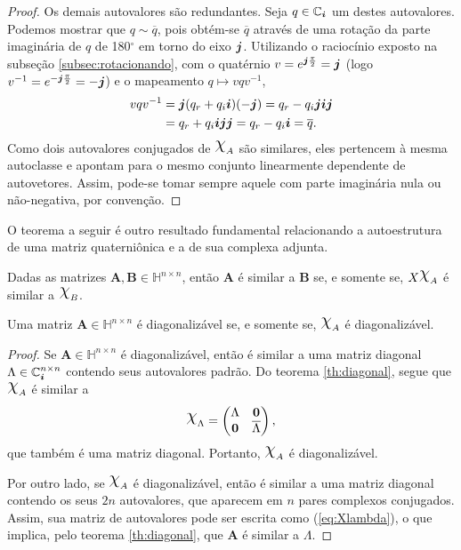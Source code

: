 \begin{proof}
Os demais autovalores s\~ao redundantes. Seja $ q \in \mathbb{C}_{\boldsymbol{i}}$ um destes autovalores. Podemos mostrar que $ q \sim \overline{q} $, pois obt\'em-se $ \overline{q} $ atrav\'es de uma rota\c c\~ao da parte imagin\'aria de $ q $ de 180$ ^\circ $ em torno do eixo $ \boldsymbol{j} $. Utilizando o racioc\'inio exposto na subse\c c\~ao \ref{subsec:rotacionando}, com o quat\'ernio $ v = e^{\boldsymbol{j} \frac{\pi}{2}} = \boldsymbol{j} $ (logo $ v^{-1} = e^{- \boldsymbol{j} \frac{\pi}{2}} = -\boldsymbol{j} $) e o mapeamento $ q \mapsto v q v^{-1} $,
\begin{equation}
\begin{aligned}
v q v^{-1} &= \boldsymbol{j} (q_r + q_i \boldsymbol{i}) (-\boldsymbol{j}) = q_r - q_i \boldsymbol{j} \boldsymbol{i} \boldsymbol{j}\\
&= q_r + q_i \boldsymbol{i} \boldsymbol{j} \boldsymbol{j} = q_r - q_i \boldsymbol{i} = \overline{q}.
\end{aligned}
\end{equation}
Como dois autovalores conjugados de $ \rchi_A $ s\~ao similares, eles pertencem \`a mesma autoclasse e apontam para o mesmo conjunto linearmente dependente de autovetores. Assim, pode-se tomar sempre aquele com parte imagin\'aria nula ou n\~ao-negativa, por conven\c c\~ao.
\end{proof}

O teorema a seguir \'e outro resultado fundamental relacionando a autoestrutura de uma matriz quaterni\^onica e a de sua complexa adjunta.

\begin{theorem}
\label{th:diagonal}
Dadas as matrizes $ \mathbf{A}, \mathbf{B} \in \mathbb{H}^{n \times n} $, ent\~ao $ \mathbf{A} $ \'e similar a $ \mathbf{B} $ se, e somente se, $ X\rchi_A $ \'e similar a $ \rchi_B $.
\end{theorem}

\begin{corollary}
\label{cor:diagonalizable}
Uma matriz $  \mathbf{A} \in \mathbb{H}^{n \times n} $ \'e diagonaliz\'avel se, e somente se, $ \rchi_A $ \'e diagonaliz\'avel.
\end{corollary}
\begin{proof}
Se $ \mathbf{A} \in \mathbb{H}^{n \times n} $ \'e diagonaliz\'avel, ent\~ao \'e similar a uma matriz diagonal $ \Lambda \in \mathbb{C}^{n \times n}_{\boldsymbol{i}} $ contendo seus autovalores padr\~ao. Do teorema \ref{th:diagonal}, segue que $ \rchi_A $ \'e similar a
\begin{equation}
\label{eq:Xlambda}
\rchi_{\Lambda} =
\begin{pmatrix}
\Lambda & \mathbf{0}\\ 
\mathbf{0} & \overline{\Lambda}
\end{pmatrix},
\end{equation}
que tamb\'em \'e uma matriz diagonal. Portanto, $ \rchi_A $ \'e diagonaliz\'avel.

Por outro lado, se $ \rchi_A $ \'e diagonaliz\'avel, ent\~ao \'e similar a uma matriz diagonal contendo os seus $ 2n $ autovalores, que aparecem em $ n $ pares complexos conjugados. Assim, sua matriz de autovalores pode ser escrita como (\ref{eq:Xlambda}), o que implica, pelo teorema \ref{th:diagonal}, que $ \mathbf{A} $ \'e similar a $ \Lambda $.
\end{proof}

